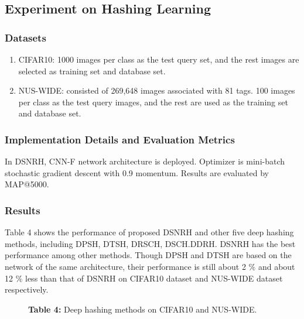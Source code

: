\documentclass[12pt,paper=a4]{scrartcl}
\theoremstyle{break}
\begin{document}
\subsection{Experiment on Hashing Learning}
\subsubsection{Datasets}
\begin{enumerate}
\item CIFAR10: 1000 images per class as the test query set, and the rest images are selected as training set and database set.
\item NUS-WIDE: consisted of 269,648 images associated with 81 tags. 100 images per class as the test query images, and the rest  are used as the training set and database set.
\end{enumerate}
\subsubsection{Implementation Details and  Evaluation Metrics}
In DSNRH, CNN-F network architecture is deployed. Optimizer is mini-batch stochastic  gradient descent with 0.9 momentum. Results are evaluated by MAP@5000.
\subsubsection{Results}
Table 4 shows the performance of proposed DSNRH and other five deep hashing methods, including DPSH, DTSH, DRSCH, DSCH.DDRH. DSNRH has the best performance among other methods. Though DPSH and DTSH are based on the network of the same architecture, their performance is still about 2 $\%$ and about 12 $\%$ less than that of DSNRH on CIFAR10 dataset and NUS-WIDE dataset respectively.
\begin{figure}[h]%
  \centering
  \caption{\textbf{Table 4:} Deep hashing methods on CIFAR10 and NUS-WIDE.}%
\end{figure}
\end{document}
